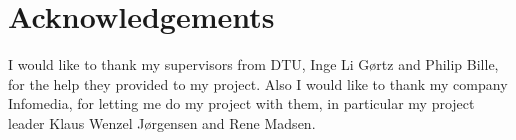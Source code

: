 \chapter{Acknowledgements}

I would like to thank my supervisors from DTU, Inge Li Gørtz and Philip Bille, for the help they provided to my project. Also I would like to thank my company Infomedia, for letting me do my project with them, in particular my project leader Klaus Wenzel Jørgensen and Rene Madsen.

